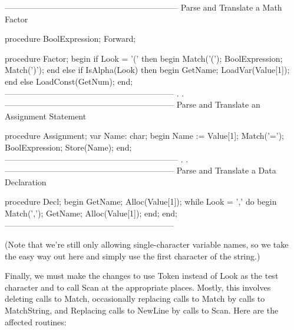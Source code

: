 \documentclass[float=false, crop=false]{standalone}
\begin{document}
\begin{code}
{---------------------------------------------------------------}
{ Parse and Translate a Math Factor }

procedure BoolExpression; Forward;

procedure Factor;
begin
   if Look = '(' then begin
      Match('(');
      BoolExpression;
      Match(')');
      end
   else if IsAlpha(Look) then begin
      GetName;
      LoadVar(Value[1]);
      end
   else
      LoadConst(GetNum);
end;
{--------------------------------------------------------------}
.
.
{--------------------------------------------------------------}
{ Parse and Translate an Assignment Statement }

procedure Assignment;
var Name: char;
begin
   Name := Value[1];
   Match('=');
   BoolExpression;
   Store(Name);
end;
{---------------------------------------------------------------}
.
.
{--------------------------------------------------------------}
{ Parse and Translate a Data Declaration }

procedure Decl;
begin
   GetName;
   Alloc(Value[1]);
   while Look = ',' do begin
      Match(',');
      GetName;
      Alloc(Value[1]);
   end;
end;
{--------------------------------------------------------------}
\end{code}

(Note that we're still only allowing single-character variable names, so we take
the easy way out here and simply use the first character of the string.)

Finally, we must make the changes to use Token instead of Look as the test
character and to call Scan at the appropriate places. Mostly, this involves
deleting calls to Match, occasionally replacing calls to Match by calls to
MatchString, and Replacing calls to NewLine by calls to Scan. Here are the
affected routines:
\end{document}
